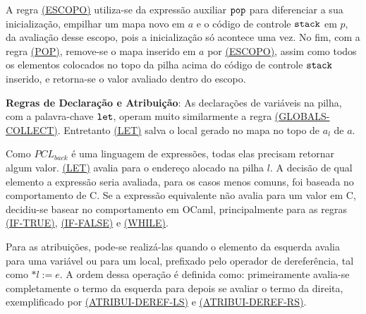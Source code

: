 A regra \hyperref[rule:escopo]{(ESCOPO)} utiliza-se da expressão auxiliar $\texttt{pop}$ para diferenciar a sua inicialização, empilhar um mapa novo em $a$ e o código de controle $\texttt{stack}$ em $p$, da avaliação desse escopo, pois a inicialização só acontece uma vez. No fim, com a regra \hyperref[rule:pop]{(POP)}, remove-se o mapa inserido em $a$ por \hyperref[rule:escopo]{(ESCOPO)}, assim como todos os elementos colocados no topo da pilha acima do código de controle $\texttt{stack}$ inserido, e retorna-se o valor avaliado dentro do escopo.

\label{sec:pcl-back:semantica:atribui}

\textbf{Regras de Declaração e Atribuição}: As declarações de variáveis na pilha, com a palavra-chave $\texttt{let}$, operam muito similarmente a regra \hyperref[rule:globals-collect]{(GLOBALS-COLLECT)}. Entretanto \hyperref[rule:let]{(LET)} salva o local gerado no mapa no topo de $a_l$ de $a$. 


Como $PCL_{back}$ é uma linguagem de expressões, todas elas precisam retornar algum valor. \hyperref[rule:let]{(LET)} avalia para o endereço alocado na pilha $l$. A decisão de qual elemento a expressão seria avaliada, para os casos menos comuns, foi baseada no comportamento de C. Se a expressão equivalente não avalia para um valor em C, decidiu-se basear no comportamento em OCaml, principalmente para as regras \hyperref[rule:if-true]{(IF-TRUE)}, \hyperref[rule:if-false]{(IF-FALSE)} e \hyperref[rule:while]{(WHILE)}.

Para as atribuições, pode-se realizá-las quando o elemento da esquerda avalia para uma variável ou para um local, prefixado pelo operador de dereferência, tal como $\text{*}l := e$. A ordem dessa operação é definida como: primeiramente avalia-se completamente o termo da esquerda para depois se avaliar o termo da direita, exemplificado por \hyperref[rule:atribui-deref-ls]{(ATRIBUI-DEREF-LS)} e \hyperref[rule:atribui-deref-rs]{(ATRIBUI-DEREF-RS)}.


